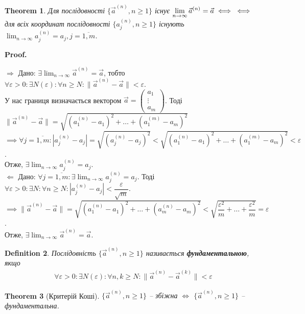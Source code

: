 \documentclass[a4paper, 10pt]{article}
\makeatletter
\def\huge{\displaystyle}
\def\qed{$\blacksquare$}
\def\rightproof{$\boxed{\Rightarrow}$ }
\def\leftproof{$\boxed{\Leftarrow}$ }
\theoremstyle{theoremdd}
\newtheorem{theorem}{Theorem}[subsection]
\theoremstyle{theoremdd}
\theoremstyle{theoremdd}
\newtheorem{definition}[theorem]{Definition}
\theoremstyle{theoremdd}
\theoremstyle{theoremdd}
\theoremstyle{theoremdd}
\theoremstyle{theoremdd}
\theoremstyle{theoremdd}
\theoremstyle{theoremdd}
\renewenvironment{proof}[1][Proof.\\]{\par
\pushQED{\hfill \qed}%
\normalfont \topsep6\p@\@plus6\p@\relax
\trivlist
\item\relax
{\bfseries
#1\@addpunct{.}}\hspace\labelsep\ignorespaces
}{%
\popQED\endtrivlist\@endpefalse
}
\newcommand\Norm[1]{\|#1\|}
\makeatother
\begin{document}
\begin{theorem}
Для послідовності $\{\vec{a}^{(n)}, n \geq 1 \}$ існує $\huge \lim_{n \to \infty} \vec{a}^{(n)} = \vec{a} \iff \\ \iff$ для всіх координат послідовності $\{a_j^{(n)}, n \geq 1\}$ існують $\huge \lim_{n \to \infty} a_j^{(n)} = a_j, j = \overline{1,m}$.
\end{theorem}

\begin{proof}
\rightproof Дано: $\exists \huge \lim_{n \to \infty} \vec{a}^{(n)} = \vec{a}$, тобто $\huge \forall \varepsilon > 0: \exists N(\varepsilon): \forall n \geq N: \|\vec{a}^{(n)} - \vec{a}\| < \varepsilon$.\\
У нас границя визначається вектором $\vec{a} = \begin{pmatrix}
a_1 \\ \vdots \\ a_m
\end{pmatrix}$. Тоді 
$\Norm{\vec{a}^{(n)} - \vec{a}} = \sqrt{(a_1^{(n)} - a_1)^2 + \dots + (a_1^{(m)} - a_m)^2}$\\
$\implies \forall j = \overline{1,m}: |a_j^{(n)} - a_j| = \sqrt{(a_j^{(n)} - a_j)^2} < \sqrt{(a_1^{(n)} - a_1)^2 + \dots + (a_1^{(m)} - a_m)^2} < \varepsilon$.\\
Отже, $\exists \huge \lim_{n \to \infty} a_j^{(n)} = a_j$.
\bigskip \\
\leftproof Дано: $\forall j = \overline{1,m}: \exists \huge \lim_{n \to \infty} a_j^{(n)} = a_j$. Тоді $\forall \varepsilon > 0: \exists N: \forall n \geq N: |a_j^{(n)} - a_j| < \dfrac{\varepsilon}{\sqrt{m}}$.\\
$\implies \Norm{\vec{a}^{(n)} - \vec{a}} = \sqrt{(a_1^{(n)} - a_1)^2 + \dots + (a_m^{(n)} - a_m)^2} < \sqrt{\dfrac{\varepsilon^2}{m} + \dots + \dfrac{\varepsilon^2}{m}} = \varepsilon$.\\
Отже, $\exists \huge \lim_{n \to \infty} \vec{a}^{(n)} = \vec{a}$.
\end{proof}

\begin{definition}
Послідовність $\{\vec{a}^{(n)}, n \geq 1 \}$ називається \textbf{фундаментальною}, якщо
\begin{align*}
\forall \varepsilon > 0: \exists N(\varepsilon): \forall n, k \geq N: \Norm{\vec{a}^{(n)} - \vec{a}^{(k)}} < \varepsilon
\end{align*}
\end{definition}

\begin{theorem}[Критерій Коші]
$\{\vec{a}^{(n)}, n \geq 1 \}$ -- збіжна $\iff$ $\{\vec{a}^{(n)}, n \geq 1 \}$ -- фундаментальна.
\end{theorem}
\end{document}
